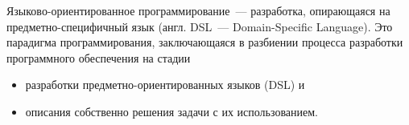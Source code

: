 
Языково-ориентированное программирование\ --- разработка, опирающаяся на
предметно-специфичный язык (англ. DSL\ --- Domain-Specific Lan\-guage).
Это парадигма программирования, заключающаяся в разбиении процесса разработки
программного обеспечения на стадии
\begin{itemize}[nosep]
  \item 
разработки предметно-ориентированных языков (DSL) и
  \item 
описания собственно решения задачи с их использованием.
\end{itemize}

